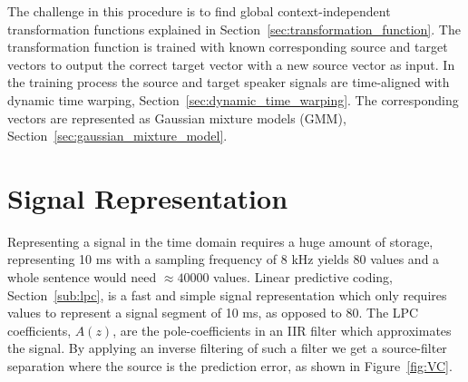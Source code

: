 The challenge in this procedure is to find global context-independent transformation functions explained in Section~\ref{sec:transformation_function}. The transformation function is trained with known corresponding source and target vectors to output the correct target vector with a new source vector as input. In the training process the source and target speaker signals are time-aligned with dynamic time warping, Section~\ref{sec:dynamic_time_warping}. The corresponding vectors are represented as Gaussian mixture models (GMM), Section~\ref{sec:gaussian_mixture_model}.



\section{Signal Representation} %
\label{the:signal_representation}
Representing a signal in the time domain requires a huge amount of storage, \eg representing 10 ms with a sampling frequency of 8 kHz yields 80 values and a whole sentence would need $\approx 40 000$ values. Linear predictive coding, Section~\ref{sub:lpc}, is a fast and simple signal representation which only requires  values to represent a signal segment of 10 ms, as opposed to 80. The LPC coefficients, $A(z)$, are the pole-coefficients in an IIR filter which approximates the signal. By applying an inverse filtering of such a filter we get a source-filter separation where the source is the prediction error, as shown in Figure~\ref{fig:VC}.

